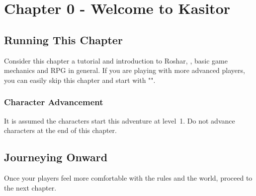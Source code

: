 \chapter{Chapter 0 - Welcome to Kasitor}
\label{chap:tutorial}

\setcounter{section}{-1}
\section{Running This Chapter}

Consider this chapter a tutorial and introduction to Roshar, \cosmereRPG{}, basic game mechanics and RPG in general. If you are playing with more advanced players, you can easily skip this chapter and start with "".

\subsection{Character Advancement}

It is assumed the characters start this adventure at level~1. Do not advance characters at the end of this chapter.








\section{Journeying Onward}

Once your players feel more comfortable with the rules and the world, proceed to the next chapter.